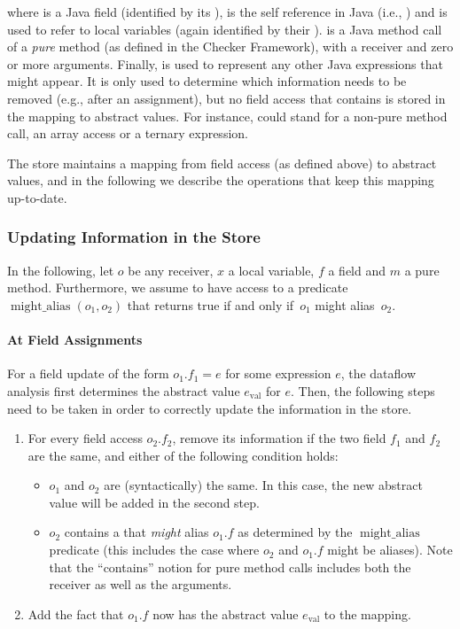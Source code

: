 \begin{new}
where  is a Java field (identified by its ),
 is the self reference in Java (i.e., )
and  is used to refer to local variables (again
identified by their ).
 is a Java method call of a \textit{pure} method
(as defined in the Checker Framework), with a receiver and zero or more
arguments.  Finally,  is used to represent any other
Java expressions that might appear.  It is only used to determine which
information needs to be removed (e.g., after an assignment), but no field
access that contains  is stored in the mapping to
abstract values.  For instance,  could stand for
a non-pure method call, an array access or a ternary expression.

The store maintains a mapping from field access (as defined above) to
abstract values, and in the following we describe the operations that
keep this mapping up-to-date.

\subsubsection{Updating Information in the Store}

\newcommand{\alias}{\operatorname{might\_alias}}

In the following, let $o$ be any receiver, $x$ a local variable, $f$ a
field and $m$ a pure method.  Furthermore, we assume to have access to
a predicate $\alias(o_1,o_2)$ that returns true if and only
if~$o_1$ might alias~$o_2$.

\paragraph{At Field Assignments}
For a field update of the form $o_1.f_1 = e$ for some expression $e$, the
dataflow analysis first determines the abstract value $e_\text{val}$ for $e$.
Then, the following steps need to be taken in order to correctly update
the information in the store.
\begin{enumerate}
    \item For every field access $o_2.f_2$, remove its information if
    the two field $f_1$ and $f_2$ are the same, and either of the following
    condition holds:
    \begin{itemize}
        \item $o_1$ and $o_2$ are (syntactically) the same.  In this case, the
        new abstract value will be added in the second step.
        \item $o_2$ contains a  that \emph{might}
        alias $o_1.f$ as determined by the $\alias$
        predicate (this includes the case where $o_2$ and $o_1.f$ might be
        aliases).  Note that the ``contains'' notion for pure method calls
        includes both the receiver as well as the arguments.
    \end{itemize}
    \item Add the fact that $o_1.f$ now has the abstract value $e_\text{val}$
    to the mapping.
\end{enumerate}



\end{new}
